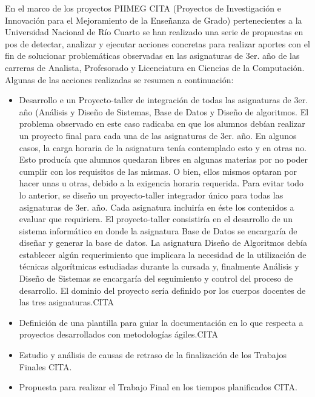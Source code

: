  
En el marco de los proyectos PIIMEG CITA (Proyectos de Investigación e Innovación para el Mejoramiento de la Enseñanza de Grado) pertenecientes a la Universidad
 Nacional de Río Cuarto se han realizado una serie de propuestas en pos de detectar, analizar y ejecutar acciones concretas para realizar aportes con el 
 fin de solucionar problemáticas observadas en las asignaturas de 3er. año de las carreras de Analista, Profesorado y 
 Licenciatura en Ciencias de la Computación. Algunas de las acciones realizadas se resumen a continuación:
 \begin{itemize}
 \item Desarrollo e un Proyecto-taller de integración de todas las asignaturas de 3er. año (Análisis y Diseño de Sistemas, Base de Datos y 
  Diseño de algoritmos. El problema observado en este caso radicaba en que los alumnos debían realizar un proyecto final  para cada una de las asignaturas
 de 3er. año. En algunos casos, la carga horaria de la asignatura tenía contemplado esto y en otras no. Esto producía que  alumnos
quedaran libres en algunas materias por no poder cumplir con los requisitos de las mismas. O bien, ellos mismos optaran por hacer unas u otras, debido a la exigencia horaria requerida.  
Para evitar todo lo anterior, se diseño un proyecto-taller integrador único para todas las asignaturas de 3er. año. Cada asignatura incluiría en éste 
los contenidos a evaluar que requiriera. El proyecto-taller consistiría en el desarrollo de un
 sistema informático en donde la asignatura Base de Datos se encargaría de diseñar y generar la base de datos.
 La asignatura Diseño de Algoritmos 
 debía establecer 
 algún requerimiento que implicara la necesidad de la utilización de técnicas algorítmicas estudiadas durante la cursada y, finalmente  Análisis y Diseño de Sistemas
 se encargaría del seguimiento y control del proceso de desarrollo. El dominio del proyecto sería definido por los cuerpos docentes de las tres asignaturas.CITA
 \item Definición de una plantilla para guiar la documentación en lo que respecta a proyectos desarrollados con metodologías ágiles.CITA 
\item Estudio y análisis de causas de retraso de la finalización de los Trabajos Finales CITA. 
\item Propuesta para realizar el Trabajo Final en los tiempos planificados CITA.
\end{itemize}

